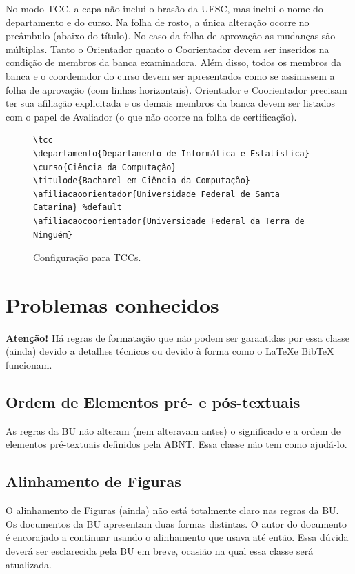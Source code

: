 \documentclass[embeddedlogo]{../ufsc-thesis-rn46-2019}
\begin{document}
No modo TCC, a capa não inclui o brasão da UFSC, mas inclui o nome do
departamento e do curso. Na folha de rosto, a única alteração ocorre no
preâmbulo (abaixo do título). No caso da folha de aprovação as mudanças são
múltiplas. Tanto o Orientador quanto o Coorientador devem ser inseridos na
condição de membros da banca examinadora. Além disso, todos os membros da banca
e o coordenador do curso devem ser apresentados como se assinassem a folha de
aprovação (com linhas horizontais). Orientador e Coorientador precisam ter sua
afiliação explicitada e os demais membros da banca devem ser listados com o
papel de Avaliador (o que não ocorre na folha de certificação).

\begin{figure}[tb]
  \centering
  \caption{Configuração para TCCs.}
  \label{fig:tccs-conf}
\begin{verbatim}
\tcc
\departamento{Departamento de Informática e Estatística}
\curso{Ciência da Computação}
\titulode{Bacharel em Ciência da Computação}
\afiliacaoorientador{Universidade Federal de Santa Catarina} %default
\afiliacaocoorientador{Universidade Federal da Terra de Ninguém}
\end{verbatim}
\end{figure}





\chapter{Problemas conhecidos}
\label{ch:problems}

\textbf{Atenção!} Há regras de formatação que não podem ser garantidas por essa
classe (ainda) devido a detalhes técnicos ou devido à forma como o \LaTeX e
BibTeX funcionam.

\section{Ordem de Elementos pré- e pós-textuais}
As regras da BU não alteram (nem alteravam antes) o significado e a ordem de
elementos pré-textuais definidos pela ABNT. Essa classe não tem como ajudá-lo.

\section{Alinhamento de Figuras}
O alinhamento de Figuras (ainda) não está totalmente claro nas regras da BU. Os
documentos da BU apresentam duas formas distintas. O autor do documento é
encorajado a continuar usando o alinhamento que usava até então. Essa dúvida
deverá ser esclarecida pela BU em breve, ocasião na qual essa classe será
atualizada.
\end{document}
